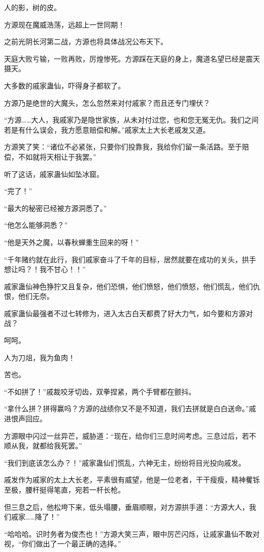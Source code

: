 \begin{this_body}
人的影，树的皮。

方源现在魔威浩荡，远超上一世同期！

之前光阴长河第二战，方源也将具体战况公布天下。

天庭大败亏输，一败再败，厉煌惨死。方源踩在天庭的身上，魔道名望已经是震天摄天。

大多数的戚家蛊仙，吓得身子都软了。

方源乃是绝世的大魔头，怎么忽然来对付戚家？而且还专门埋伏？

“方源……大人，我戚家乃是隐世家族，从未对付过您，也和您无冤无仇。我们之间若是有什么误会，我方愿意赔偿和解。”戚家太上大长老戚发又道。

方源笑了笑：“诸位不必紧张，只要你们投靠我，我给你们留一条活路。至于赔偿，不如就将天相让于我罢。”

听了这话，戚家蛊仙如坠冰窟。

“完了！”

“最大的秘密已经被方源洞悉了。”

“他怎么能够洞悉？”

“他是天外之魔，以春秋蝉重生回来的呀！”

“千年赌约就在此行，我们戚家奋斗了千年的目标，居然就要在成功的关头，拱手想让吗？！我不甘心！！”

戚家蛊仙神色狰狞又且复杂，他们恐惧，他们愤怒，他们愤怒，他们慌乱，他们仇恨，他们无奈。

戚家蛊仙最强者不过七转修为，进入太古白天都费了好大力气，如今要和方源对战？

呵呵。

人为刀俎，我为鱼肉！

苦也。

“不如拼了！”戚裁咬牙切齿，双拳捏紧，两个手臂都在颤抖。

“拿什么拼？拼得赢吗？方源的战绩你又不是不知道，我们去拼就是白白送命。”戚进恨声回应。

方源眼中闪过一丝异芒，威胁道：“现在，给你们三息时间考虑。三息过后，若不顺从我，就都给我死罢。”

“我们到底该怎么办？！”戚家蛊仙们慌乱，六神无主，纷纷将目光投向戚发。

戚发作为戚家的太上大长老，平素很有威望，他是一位老者，干干瘦瘦，精神矍铄至极，腰杆挺得笔直，宛若一杆长枪。

但三息之后，他松垮下来，低头塌腰，垂眉顺眼，对方源拱手道：“方源大人，我们戚家……降了！”

“哈哈哈。识时务者为俊杰也！”方源大笑三声，眼中厉芒闪烁，让戚家蛊仙不敢对视，“你们做出了一个最正确的选择。”


\end{this_body}
